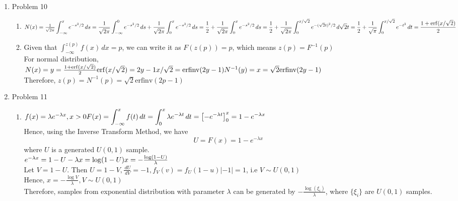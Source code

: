 \documentclass[a4paper]{article}
\def\ii{\displaystyle\int}
\def\lB{\left[}
\def\rB{\right]}
\def\erf{\mathrm{erf}}
\def\erfinv{\mathrm{erfinv}}
\begin{document}
\begin{enumerate}
\begin{enumerate}
\end{enumerate}

\pagebreak

\item Problem 10
\begin{enumerate}
\item
$N(x)=\frac{1}{\sqrt{2\pi}}\ii_{-\infty}^x e^{-s^2/2}\,ds\\
=\frac{1}{\sqrt{2\pi}}\ii_{-\infty}^0 e^{-s^2/2}\,ds+\frac{1}{\sqrt{2\pi}}\ii_0^x e^{-s^2/2}\,ds\\
=\frac{1}{2}+\frac{1}{\sqrt{2\pi}}\ii_0^x e^{-s^2/2}\,ds\\
=\frac{1}{2}+\frac{1}{\sqrt{2\pi}}\ii_0^{x/\sqrt{2}} e^{-(\sqrt{2}t)^2/2}\,d\sqrt{2}t\\
=\frac{1}{2}+\frac{1}{\sqrt{\pi}}\ii_0^{x/\sqrt{2}} e^{-t^2}\,dt\\
=\frac{1+\erf(x/\sqrt{2})}{2}$

\item
Given that $\ii_{-\infty}^{z(p)}f(x)\,dx=p$, we can write it as $F(z(p))=p$, which means $z(p)=F^{-1}(p)$\\
For normal distribution,\\
$N(x)=y=\frac{1+\erf(x/\sqrt{2})}{2}\\
\erf(x/\sqrt{2})=2y-1\\
x/\sqrt{2}=\erfinv(2y-1)\\
N^{-1}(y)=x=\sqrt{2}\erfinv(2y-1)$\\
Therefore, $z(p)=N^{-1}(p)=\sqrt{2}\erfinv(2p-1)$
\end{enumerate}

\pagebreak

\item Problem 11
\begin{enumerate}
\item
$f(x)=\lambda e^{-\lambda x},x>0\\
F(x)=\ii_{-\infty}^x f(t)\,dt=\ii_0^x \lambda e^{-\lambda t}\,dt\\
=\lB-e^{-\lambda t}\rB_0^x=1-e^{-\lambda x}$\\
Hence, using the Inverse Transform Method, we have
\[U=F(x)=1-e^{-\lambda x}\]
where $U$ is a generated $U(0,1)$ sample.\\
$e^{-\lambda x}=1-U\\
-\lambda x=\log(1-U)\\
x=-\frac{\log(1-U)}{\lambda}$\\
Let $V=1-U$. Then $U=1-V, \frac{\,dU}{\,dV}=-1,f_V(v)=f_U(1-u)|-1|=1$, i.e $V\sim U(0,1)$\\
Hence, $x=-\frac{\log V}{\lambda},V\sim U(0,1)$\\
Therefore, samples from exponential distribution with parameter $\lambda$ can be generated by $-\frac{\log(\xi_i)}{\lambda}$, where $\{\xi_i\}$ are $U(0,1)$ samples.


\end{enumerate}
\end{enumerate}
\end{document}
